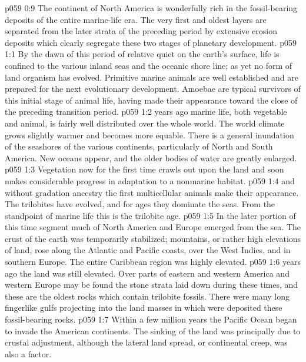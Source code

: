 \vs p059 0:9 The continent of North America is wonderfully rich in the fossil\hyp{}bearing deposits of the entire marine\hyp{}life era. The very first and oldest layers are separated from the later strata of the preceding period by extensive erosion deposits which clearly segregate these two stages of planetary development.
\vs p059 1:1 By the dawn of this period of relative quiet on the earth’s surface, life is confined to the various inland seas and the oceanic shore line; as yet no form of land organism has evolved. Primitive marine animals are well established and are prepared for the next evolutionary development. Amoebae are typical survivors of this initial stage of animal life, having made their appearance toward the close of the preceding transition period.
\vs p059 1:2 \pc {} years ago marine life, both vegetable and animal, is fairly well distributed over the whole world. The world climate grows slightly warmer and becomes more equable. There is a general inundation of the seashores of the various continents, particularly of North and South America. New oceans appear, and the older bodies of water are greatly enlarged.
\vs p059 1:3 Vegetation now for the first time crawls out upon the land and soon makes considerable progress in adaptation to a nonmarine habitat.
\vs p059 1:4  and without gradation ancestry the first multicellular animals make their appearance. The trilobites have evolved, and for ages they dominate the seas. From the standpoint of marine life this is the trilobite age.
\vs p059 1:5 In the later portion of this time segment much of North America and Europe emerged from the sea. The crust of the earth was temporarily stabilized; mountains, or rather high elevations of land, rose along the Atlantic and Pacific coasts, over the West Indies, and in southern Europe. The entire Caribbean region was highly elevated.
\vs p059 1:6 \pc {} years ago the land was still elevated. Over parts of eastern and western America and western Europe may be found the stone strata laid down during these times, and these are the oldest rocks which contain trilobite fossils. There were many long fingerlike gulfs projecting into the land masses in which were deposited these fossil\hyp{}bearing rocks.
\vs p059 1:7 Within a few million years the Pacific Ocean began to invade the American continents. The sinking of the land was principally due to crustal adjustment, although the lateral land spread, or continental creep, was also a factor.
